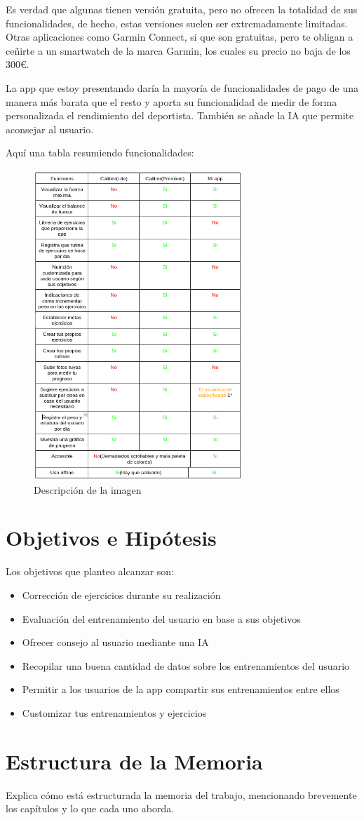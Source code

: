 Es verdad que algunas tienen versión gratuita, pero no ofrecen la totalidad de sus funcionalidades, de hecho, estas versiones suelen ser extremadamente limitadas. Otras aplicaciones como Garmin Connect, si que son gratuitas, pero te obligan a ceñirte a un smartwatch de la marca Garmin, los cuales su precio no baja de los 300€.

La app que estoy presentando daría la mayoría de funcionalidades de pago de una manera más barata que el resto y aporta su funcionalidad de medir de forma personalizada el rendimiento del deportista. También se añade la IA que permite aconsejar al usuario.

Aquí una tabla resumiendo funcionalidades:
\begin{figure}[h!]
  \centering
  \includegraphics[width=0.7\textwidth]{tablas/comparativa.png}
  \caption{Descripción de la imagen}
  \label{fig:imagen}
\end{figure}
\newpage



\section{Objetivos e Hipótesis}
Los objetivos que planteo alcanzar son:
\begin{itemize}
	\item Corrección de ejercicios durante su realización
	\item Evaluación del entrenamiento del usuario en base a sus objetivos
	\item Ofrecer consejo al usuario mediante una IA
	\item Recopilar una buena cantidad de datos sobre los entrenamientos del usuario
	\item Permitir a los usuarios de la app compartir sus entrenamientos entre ellos
	\item Customizar tus entrenamientos y ejercicios
\end{itemize}

\section{Estructura de la Memoria}
Explica cómo está estructurada la memoria del trabajo, mencionando brevemente los capítulos y lo que cada uno aborda.
